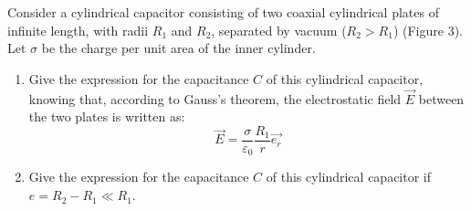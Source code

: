 \documentclass[12pt]{article}
\begin{document}
\section{}
Consider a cylindrical capacitor consisting of two coaxial cylindrical plates of infinite length, with radii $R_1$ and $R_2$, separated by vacuum ($R_2 > R_1$) (Figure 3). Let $\sigma$ be the charge per unit area of the inner cylinder.
\begin{figure}[H]
\centering
{}
\caption{}
\end{figure}

\begin{enumerate}
\item Give the expression for the capacitance $C$ of this cylindrical capacitor, knowing that, according to Gauss's theorem, the electrostatic field $\vec{E}$ between the two plates is written as:
$$
\vec{E} = \frac{\sigma}{\varepsilon_0} \frac{R_1}{r} \vec{e_r}
$$
\item Give the expression for the capacitance $C$ of this cylindrical capacitor if $e = R_2 - R_1 \ll R_1$.
\end{enumerate}
\end{document}
